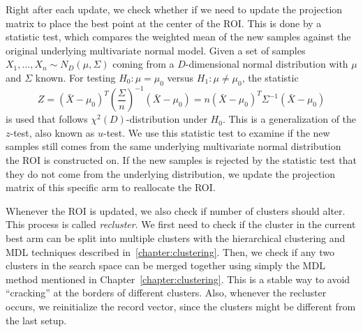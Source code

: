 Right after each update, we check whether if we need to update the projection matrix to place the best point at the center of the ROI.
This is done by a statistic test, which compares the weighted mean of the new samples against the original underlying multivariate normal model.
Given a set of samples $X_1, ..., X_n \sim N_{D}(\mu, \Sigma)$ coming from a $D$-dimensional normal distribution with $\mu$ and $\Sigma$ known. 
For testing $H_0: \mu = \mu_0$ versus $H_1: \mu \neq \mu_0$, the statistic
\begin{displaymath}
Z = ( \bar{X} - \mu_0 )^T (\frac{\Sigma}{n})^{-1} ( \bar{X} - \mu_0 ) = n( \bar{X} - \mu_0 )^T \Sigma^{-1} ( \bar{X} - \mu_0 )
\end{displaymath}
is used that follows $ \chi^{2}(D)$-distribution under $H_0$.
This is a generalization of the $z$-test, also known as $u$-test.
We use this statistic test to examine if the new samples still comes from the same underlying multivariate normal distribution the ROI is constructed on.
If the new samples is rejected by the statistic test that they do not come from the underlying distribution, 
we update the projection matrix of this specific arm to reallocate the ROI.

Whenever the ROI is updated, we also check if number of clusters should alter.
This process is called \textit{recluster}.
We first need to check if the cluster in the current best arm can be split into multiple clusters 
with the hierarchical clustering and MDL techniques described in~\ref{chapter:clustering}.  
Then, we check if any two clusters in the search space can be merged together 
using simply the MDL method mentioned in Chapter~\ref{chapter:clustering}.  
This is a stable way to avoid ``cracking'' at the borders of different clusters.
Also, whenever the recluster occurs, we reinitialize the record vector, since the clusters might be different from the last setup.


